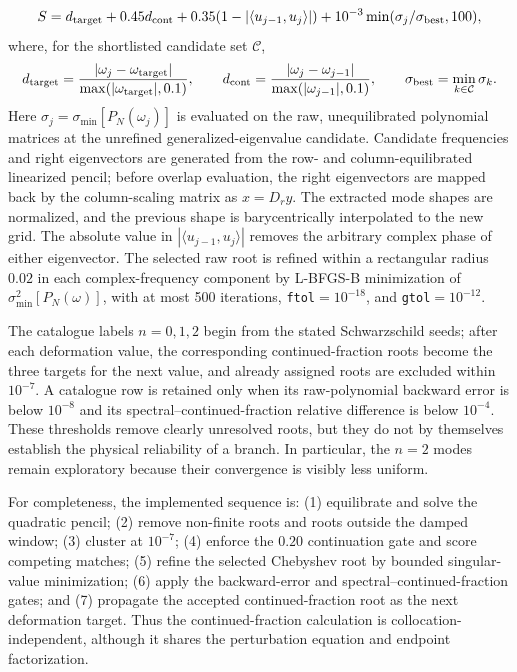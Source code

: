 \documentclass[12pt,a4paper]{article}
\begin{document}
\begin{equation*}
S=d_{\rm target}+0.45d_{\rm cont}+0.35(1-|\langle u_{j-1},u_j\rangle|)
+10^{-3}\min(\sigma_j/\sigma_{\rm best},100),
\end{equation*}
where, for the shortlisted candidate set \(\mathcal C\),
\begin{equation*}
d_{\rm target}=\frac{|\omega_j-\omega_{\rm target}|}
{\max(|\omega_{\rm target}|,0.1)},\qquad
d_{\rm cont}=\frac{|\omega_j-\omega_{j-1}|}
{\max(|\omega_{j-1}|,0.1)},\qquad
\sigma_{\rm best}=\min_{k\in\mathcal C}\sigma_k.
\end{equation*}
Here \(\sigma_j=\sigma_{\min}[P_N(\omega_j)]\) is evaluated on the raw,
unequilibrated polynomial matrices at the unrefined generalized-eigenvalue
candidate.  Candidate frequencies and right eigenvectors are generated from
the row- and column-equilibrated linearized pencil; before overlap evaluation,
the right eigenvectors are mapped back by the column-scaling matrix as
\(x=D_r y\).  The extracted mode shapes are normalized, and the previous shape
is barycentrically interpolated to the new grid.  The absolute value in
\(|\langle u_{j-1},u_j\rangle|\) removes the arbitrary complex phase of either
eigenvector.
The selected raw root is refined within a rectangular radius \(0.02\) in each
complex-frequency component by L-BFGS-B minimization of
\(\sigma_{\min}^2[P_N(\omega)]\), with at most 500 iterations,
\texttt{ftol}\(=10^{-18}\), and \texttt{gtol}\(=10^{-12}\).

The catalogue labels \(n=0,1,2\) begin from the stated Schwarzschild seeds;
after each deformation value, the corresponding continued-fraction roots
become the three targets for the next value, and already assigned roots are
excluded within \(10^{-7}\). A catalogue row is retained only when its
raw-polynomial backward error is below \(10^{-8}\) and its
spectral--continued-fraction relative difference is below \(10^{-4}\). These
thresholds remove clearly unresolved roots, but they do not by themselves
establish the physical reliability of a branch. In particular, the \(n=2\)
modes remain exploratory because their convergence is visibly less uniform.

For completeness, the implemented sequence is: (1) equilibrate and solve the quadratic
pencil; (2) remove non-finite roots and roots outside the damped window;
(3) cluster at \(10^{-7}\); (4) enforce the \(0.20\) continuation gate and
score competing matches; (5) refine the selected Chebyshev root by bounded
singular-value minimization; (6) apply the backward-error and
spectral--continued-fraction gates; and (7) propagate the accepted
continued-fraction root as the next deformation target.  Thus the
continued-fraction calculation is collocation-independent, although it shares
the perturbation equation and endpoint factorization.
\end{document}
